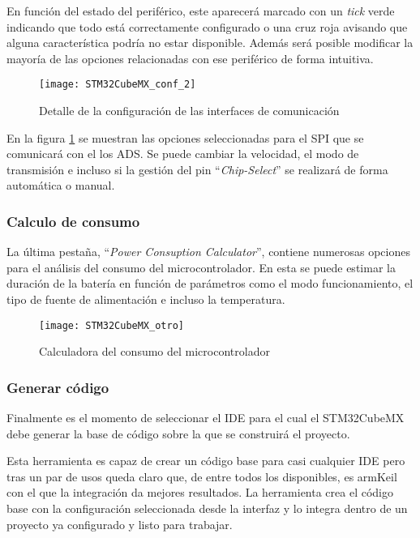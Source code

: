 En función del estado del periférico, este aparecerá marcado con un \textit{tick} verde indicando que todo está correctamente configurado o una cruz roja avisando que alguna característica podría no estar disponible. Además será posible modificar la mayoría de las opciones relacionadas con ese periférico de forma intuitiva. 

\begin{figure} [h]
    \centering
    \texttt{[image: STM32CubeMX\_conf\_2]}
    \caption{Detalle de la configuración de las interfaces de comunicación}
    \label{fig:STM32CubeMX_conf_2}
\end{figure}

En la figura \ref{fig:STM32CubeMX_conf_2} se muestran las opciones seleccionadas para el SPI que se comunicará con el los ADS. Se puede cambiar la velocidad, el modo de transmisión e incluso si la gestión del pin ``\textit{Chip-Select}'' se realizará de forma automática o manual.

\subsubsection{Calculo de consumo\label{sec:Configuracion_micro_consumo}}

La última pestaña, ``\textit{Power Consuption Calculator}'', contiene numerosas opciones para el análisis del consumo del microcontrolador. En esta se puede estimar la duración de la batería en función de parámetros como el modo funcionamiento, el tipo de fuente de alimentación e incluso la temperatura.

\begin{figure} [h]
    \centering
    \texttt{[image: STM32CubeMX\_otro]}
    \caption{Calculadora del consumo del microcontrolador}
    \label{fig:STM32CubeMX_otro}
\end{figure}

\subsubsection{Generar código\label{sec:Configuracion_micro_generador}}

Finalmente es el momento de seleccionar el IDE para el cual el STM32CubeMX debe generar la base de código sobre la que se construirá el proyecto.

Esta herramienta es capaz de crear un código base para casi cualquier \acrshort{IDE} pero tras un par de usos queda claro que, de entre todos los disponibles, es armKeil con el que la integración da mejores resultados. La herramienta crea el código base con la configuración seleccionada desde la interfaz y lo integra dentro de un proyecto ya configurado y listo para trabajar.

